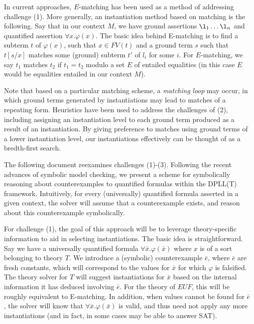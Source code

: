 \documentclass{llncs}
\begin{document}
In current approaches, $E$-matching has been used as a method of addressing challenge (1).
More generally, an instantiation method based on matching is the following.
Say that in our context $M$, we have ground assertions $\l_1 \ldots \l_n$ and quantified assertion $\forall x. \varphi(x)$.
The basic idea behind E-matching is to find a subterm $t$ of $\varphi(x)$, such that $x \in FV( t )$ and a ground term $s$ such that $t[s/x]$ matches some (ground) subterm $t'$ of $l_i$ for some $i$.
For $E$-matching, we say $t_1$ matches $t_2$ if $t_1 = t_2$ modulo a set $E$ of entailed equalities (in this case $E$ would be equalities entailed in our context $M$).

Note that based on a particular matching scheme, a \emph{matching loop} may occur, in which ground terms generated by instantiations may lead to matches of a repeating form.
Heuristics have been used to address the challenges of (2), including assigning an instantiation level to each ground term produced as a result of an instantiation.
By giving preference to matches using ground terms of a lower instantiation level, our instantiations effectively can be thought of as a bredth-first search.

The following document reexamines challenges (1)-(3).
Following the recent advances of symbolic model checking, we present a scheme for symbolically reasoning about counterexamples to quantified formulas within the DPLL(T) framework.
Intuitively, for every (universally) quantified formula asserted in a given context, the solver will assume that a counterexample exists, and reason about this counterexample symbolically.

For challenge (1), the goal of this approach will be to leverage theory-specific information to aid in selecting instantiations.
The basic idea is straightforward.
Say we have a universally quantified formula $\forall \bar{x}. \varphi( \bar{x} )$ where $x$ is of a sort belonging to theory $T$.
We introduce a (symbolic) counterexample $\bar{e}$, where $\bar{e}$ are fresh constants, which will correspond to the values for $\bar{x}$ for which $\varphi$ is falsified.
The theory solver for $T$ will suggest instantiations for $\bar{x}$ based on the internal information it has deduced involving $\bar{e}$.
For the theory of $EUF$, this will be roughly equivalent to E-matching.
In addition, when values cannot be found for $\bar{e}$, the solver will know that $\forall \bar{x}. \varphi( \bar{x} )$ is valid, and thus need not apply any more instantiations (and in fact, in some cases may be able to answer SAT).
\end{document}
